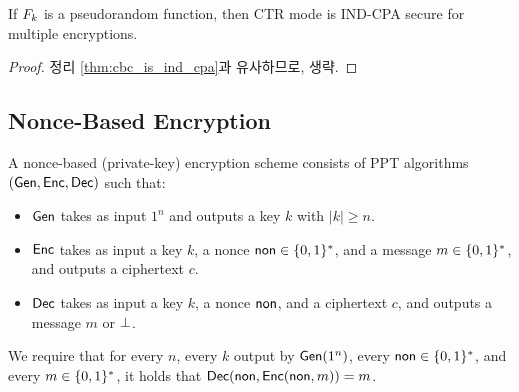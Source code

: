 \newline

\begin{theorem} \label{thm:ctr_is_ind_cpa}
  If $F_{k}$ is a pseudorandom function, then CTR mode is \textsf{IND-CPA}
  secure for multiple encryptions.
\end{theorem}

\begin{proof}
  정리 \ref{thm:cbc_is_ind_cpa}과 유사하므로, 생략.
\end{proof}

\subsection*{Nonce-Based Encryption}


\newline

\begin{definition} \label{def:nonce}
  A nonce-based (private-key) encryption scheme consists of PPT algorithms
  $(\textsf{Gen}, \textsf{Enc}, \textsf{Dec})$ such that:
  \begin{itemize}
    \item $\textsf{Gen}$ takes as input $1^n$ and outputs a key $k$ with $|k| \ge n$.
    \item $\textsf{Enc}$ takes as input a key $k$, a nonce $\textsf{non} \in \{0, 1\}^{*}$, and
          a message $m \in \{0, 1\}^{*}$, and outputs a ciphertext $c$.
    \item $\textsf{Dec}$ takes as input a key $k$, a nonce $\textsf{non}$, and
          a ciphertext $c$, and outputs a message $m$ or $\perp$.
  \end{itemize}
  We require that for every $n$, every $k$ output by $\textsf{Gen}(1^n)$, every
  $\textsf{non} \in \{0, 1\}^{*}$, and every $m \in \{0, 1\}^{*}$, it holds that
  $\textsf{Dec}(\textsf{non}, \textsf{Enc}(\textsf{non}, m)) = m$.
\end{definition}

